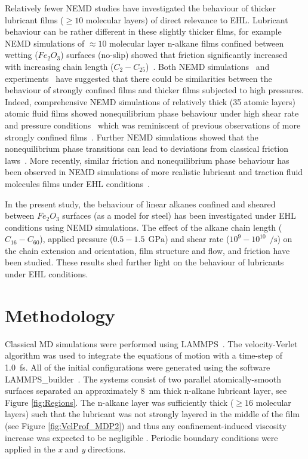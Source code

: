 \documentclass[5p]{elsarticle}
\begin{document}
Relatively fewer NEMD studies have investigated the behaviour of thicker lubricant films ($\geq 10$ molecular layers) of direct relevance to EHL. Lubricant behaviour can be rather different in these slightly thicker films, for example NEMD simulations of $\approx 10$ molecular layer n-alkane films confined between wetting ($Fe_2O_3$) surfaces (no-slip) showed that friction significantly increased with increasing chain length ($C_2 - C_{25}$)~\cite{Savio2012}. Both NEMD simulations~\cite{Thompson1992,Robbins1996} and experiments~\cite{VanAlsten1988} have suggested that there could be similarities between the behaviour of strongly confined films and thicker films subjected to high pressures. Indeed, comprehensive NEMD simulations of relatively thick (35 atomic layers) atomic fluid films showed nonequilibrium phase behaviour under high shear rate and pressure conditions~\cite{Heyes2012,Gattinoni2013} which was reminiscent of previous observations of more strongly confined films~\cite{Thompson1990}. Further NEMD simulations showed that the nonequilibrium phase transitions can lead to deviations from classical friction laws~\cite{Mackowiak2016}. More recently, similar friction and nonequilibrium phase behaviour has been observed in NEMD simulations of more realistic lubricant and traction fluid molecules films under EHL conditions~\cite{Ewen2017a}.

In the present study, the behaviour of linear alkanes confined and sheared between $Fe_2O_3$ surfaces (as a model for steel) has been investigated under EHL conditions using NEMD simulations. The effect of the alkane chain length ($C_{16} - C_{60}$), applied pressure ($0.5 - 1.5~\SI{}{\giga\pascal}$) and shear rate ($10^{9} - 10^{10} ~\SI{}{\per\second}$) on the chain extension and orientation, film structure and flow, and friction have been studied. These results shed further light on the behaviour of lubricants under EHL conditions.


\section{Methodology}
\label{method}

Classical MD simulations were performed using LAMMPS~\cite{Plimpton1995}. The velocity-Verlet algorithm was used to integrate the equations of motion with a time-step of \SI{1.0}{\femto\second}. All of the initial configurations were generated using the software LAMMPS\_builder~\cite{Ewen2017b,Ewen2017,Jewett2013,HjorthLarsen2017}. The systems consist of two parallel atomically-smooth surfaces separated an approximately \SI{8}{\nano\meter} thick n-alkane lubricant layer, see Figure \ref{fig:Regions}. The n-alkane layer was sufficiently thick ($\geq 16$ molecular layers) such that the lubricant was not strongly layered in the middle of the film (see Figure \ref{fig:VelProf_MDP2}) and thus any confinement-induced viscosity increase was expected to be negligible \cite{Gee1990}. Periodic boundary conditions were applied in the \emph{x} and \emph{y} directions.
\end{document}
